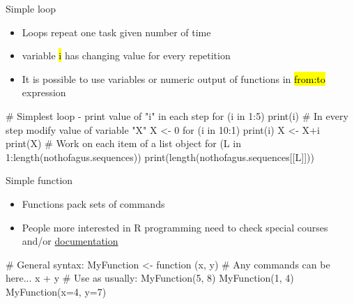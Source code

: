 \documentclass[compress, ucs, xelatex, 11pt, xcolor=svgnames,
  hyperref={
    bookmarks=true,
    unicode=true,
    colorlinks=true,
    pdftitle={Molecular data in R},
    plainpages=false,
    pdfauthor={Vojtech Zeisek},
    pdfsubject={Course about phylogeny and evolution in R},
    pdfcreator={XeLaTeX},
    pdfkeywords={R, evolution, phylogeny, molecular data},
    linkcolor=Tomato,
    anchorcolor=SaddleBrown,
    citecolor=Goldenrod,
    filecolor=DarkMagenta,
    menucolor=Sienna,
    urlcolor=DarkTurquoise,
    pdftex},
  url={hyphens, lowtilde} %
  ]{beamer}
\renewcommand{\texttt}[1]{\hl{\ttfamily #1}}
\begin{document}
\begin{frame}[fragile]{Simple loop}
  \begin{itemize}
    \item Loops repeat one task given number of time
    \item variable \texttt{i} has changing value for every repetition
    \item It is possible to use variables or numeric output of functions in \texttt{from:to} expression
  \end{itemize}
  \begin{spluscode}
    # Simplest loop - print value of "i" in each step
    for (i in 1:5) { print(i) }
    # In every step modify value of variable "X"
    X <- 0
    for (i in 10:1) { 
      print(i)
      X <- X+i
      print(X)
      }
    # Work on each item of a list object
    for (L in 1:length(nothofagus.sequences)) {
      print(length(nothofagus.sequences[[L]])) }
  \end{spluscode}
\end{frame}

\begin{frame}[fragile]{Simple function}
  \begin{itemize}
    \item Functions pack sets of commands
    \item People more interested in R programming need to check special courses and/or \href{https://cran.r-project.org/manuals.html}{documentation}
  \end{itemize}
  \begin{spluscode}
    # General syntax:
    MyFunction <- function (x, y) {
      # Any commands can be here...
      x + y
      }
    # Use as usually:
    MyFunction(5, 8)
    MyFunction(1, 4)
    MyFunction(x=4, y=7)
  \end{spluscode}
\end{frame}
\end{document}
